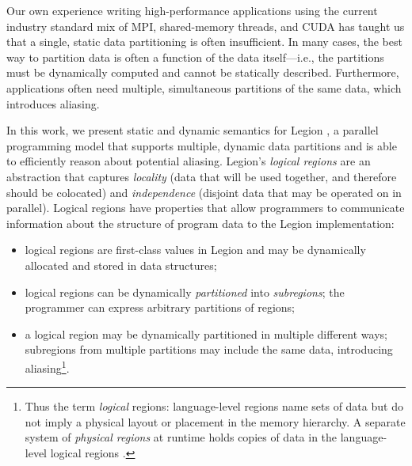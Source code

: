 Our own experience writing high-performance applications
using the current industry standard mix of MPI, shared-memory
threads, and CUDA has taught us that a
single, static data partitioning is often insufficient.  In many cases, the
best way to partition data is often a function of the data
itself---i.e., the partitions must be dynamically computed and cannot be statically described.
Furthermore, applications often need multiple, simultaneous partitions of
the same data, which introduces aliasing.

In this work, we present static and dynamic semantics for Legion  \cite{Legion12},
a parallel programming model that supports multiple, dynamic data partitions and is
able to efficiently reason about potential aliasing.
Legion's {\em logical regions} are an abstraction that captures {\em locality} 
(data that will be used together, and therefore should be colocated) 
and {\em independence} (disjoint data that may be operated on in parallel).  
Logical regions have properties that allow programmers to communicate information
about the structure of program data to the Legion implementation:
\begin{itemize}
\item  logical regions are first-class values in Legion
and may be dynamically allocated and stored in data structures;

\item logical regions can be dynamically {\em partitioned} into {\em subregions}; 
the programmer can express arbitrary partitions of regions;

\item  a logical region may be dynamically partitioned in multiple different ways;
subregions from multiple partitions may include the same data, introducing 
aliasing\footnote{Thus
  the term {\em logical} regions: language-level regions
  name sets of data but do not imply a physical layout or placement in
  the memory hierarchy. A separate system of {\em physical regions} at
  runtime holds copies of data in the language-level logical regions
  \cite{Legion12}.}.

\end{itemize}


